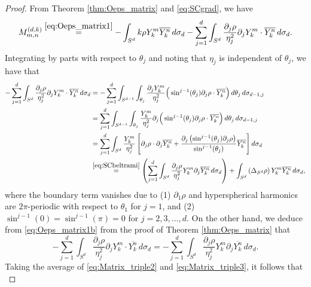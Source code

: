 \documentclass[10pt,a4paper]{amsart}
\newcommand{\cc}{\overline}
\newcommand{\del}{\partial}
\begin{document}
\begin{proof} 
From Theorem \ref{thm:Oeps_matrix} and \eqref{eq:SCgrad}, we have 
\begin{equation} \label{eq:Matrix_triple1} 
M_{m, n}^{(d, k)} \stackrel{\eqref{eq:Oeps_matrix1}}{=} -\int_{S^d} k\rho Y_k^m\cc{Y_k^n}\, d\sigma_d - \sum_{j = 1}^d\int_{S^d} \frac{\del_j\rho}{\eta_j^2}\del_jY_k^m\cdot \cc{Y_k^n}\, d\sigma_d. 
\end{equation}  
Integrating by parts with respect to $\theta_j$ and noting that $\eta_j$ is independent of $\theta_j$, we have that 
\begin{gather} 
\begin{aligned} \label{eq:Matrix_triple2}
-\sum_{j = 1}^d \int_{S^d} \frac{\del_j\rho}{\eta_j^2}\del_jY_k^m\cdot \cc{Y_k^n}\, d\sigma_d & = -\sum_{j = 1}^d \int_{S^{d - 1}}\int_{\theta_j} \frac{\del_jY_k^m}{\eta_j^2}\Big(\sin^{j- 1}(\theta_j)\del_j\rho\cdot \cc{Y_k^n}\Big)\, d\theta_j\, d\sigma_{d - 1, j} \\ 
& = \sum_{j = 1}^d \int_{S^{d - 1}}\int_{\theta_j} \frac{Y_k^m}{\eta_j^2}\del_j\Big(\sin^{j- 1}(\theta_j)\del_j\rho\cdot \cc{Y_k^n}\Big)\, d\theta_j\, d\sigma_{d - 1, j} \\ 
& = \sum_{j = 1}^d \int_{S^d} \frac{Y_k^m}{\eta_j^2}\left[\del_j\rho\cdot\del_j\cc{Y_k^n} + \frac{\del_j\left(\sin^{j - 1}(\theta_j)\del_j\rho\right)}{\sin^{j - 1}(\theta_j)}\cc{Y_k^n}\right] d\sigma_d \\ 
& \stackrel{\eqref{eq:SCbeltrami}}{=} \left(\sum_{j = 1}^d\int_{S^d} \frac{\del_j\rho}{\eta_j^2} Y_k^m\del_j\cc{Y_k^n}\, d\sigma_d\right) + \int_{S^d} \left(\Delta_{S^d}\rho\right) Y_k^m\cc{Y_k^n}\, d\sigma_d, 
\end{aligned} 
\end{gather} 
where the boundary term vanishes due to (1) $\del_1\rho$ and hyperspherical harmonics are $2\pi$-periodic with respect to $\theta_1$ for $j = 1$, and (2) $\sin^{j - 1}(0) = \sin^{j - 1}(\pi) = 0$ for $j = 2, 3, \dots, d$. On the other hand, we deduce from \eqref{eq:Oeps_matrix1b} from the proof of Theorem \ref{thm:Oeps_matrix} that 
\begin{equation} \label{eq:Matrix_triple3} 
-\sum_{j = 1}^d \int_{S^d} \frac{\del_j\rho}{\eta_j^2}\del_jY_k^m\cdot \cc{Y_k^n}\, d\sigma_d = -\sum_{j = 1}^d\int_{S^d} \frac{\del_j\rho}{\eta_j^2} Y_k^m\del_j\cc{Y_k^n}\, d\sigma_d. 
\end{equation} 
Taking the average of \eqref{eq:Matrix_triple2} and \eqref{eq:Matrix_triple3}, it follows that 
\begin{equation} \label{eq:Matrix_triple4}

\end{equation}
\end{proof}
\end{document}

